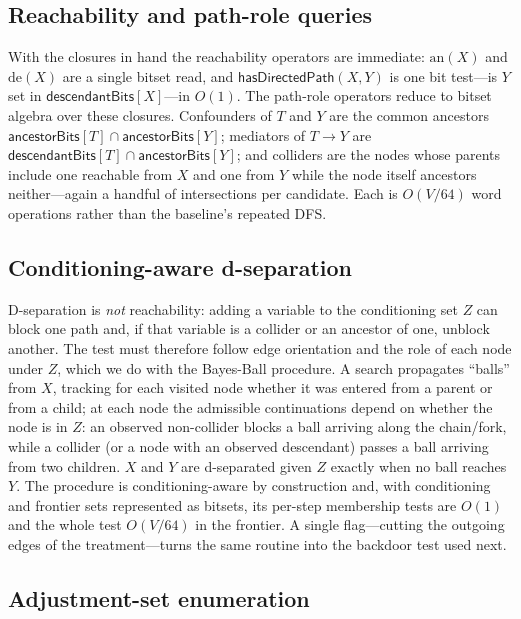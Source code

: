 \subsection{Reachability and path-role queries}\label{sec:index:reach}

With the closures in hand the reachability operators are immediate:
$\mathrm{an}(X)$ and $\mathrm{de}(X)$ are a single bitset read, and
$\textsf{hasDirectedPath}(X,Y)$ is one bit test---is $Y$ set in
$\textsf{descendantBits}[X]$---in $O(1)$. The path-role operators reduce to
bitset algebra over these closures. Confounders of $T$ and $Y$ are the common
ancestors $\textsf{ancestorBits}[T]\cap\textsf{ancestorBits}[Y]$; mediators of
$T\!\to\!Y$ are $\textsf{descendantBits}[T]\cap\textsf{ancestorBits}[Y]$; and
colliders are the nodes whose parents include one reachable from $X$ and one from
$Y$ while the node itself ancestors neither---again a handful of intersections
per candidate. Each is $O(V/64)$ word operations rather than the baseline's
repeated DFS.

\subsection{Conditioning-aware d-separation}\label{sec:index:dsep}

D-separation is \emph{not} reachability: adding a variable to the conditioning set
$Z$ can block one path and, if that variable is a collider or an ancestor of one,
unblock another. The test must therefore follow edge orientation and the role of
each node under $Z$, which we do with the Bayes-Ball procedure. A search
propagates ``balls'' from $X$, tracking for each visited node whether it was
entered from a parent or from a child; at each node the admissible continuations
depend on whether the node is in $Z$: an observed non-collider blocks a ball
arriving along the chain/fork, while a collider (or a node with an observed
descendant) passes a ball arriving from two children. $X$ and $Y$ are
d-separated given $Z$ exactly when no ball reaches $Y$. The procedure is
conditioning-aware by construction and, with conditioning and frontier sets
represented as bitsets, its per-step membership tests are $O(1)$ and the whole
test $O(V/64)$ in the frontier. A single flag---cutting the outgoing edges of the
treatment---turns the same routine into the backdoor test used next.

\subsection{Adjustment-set enumeration}\label{sec:index:adj}

